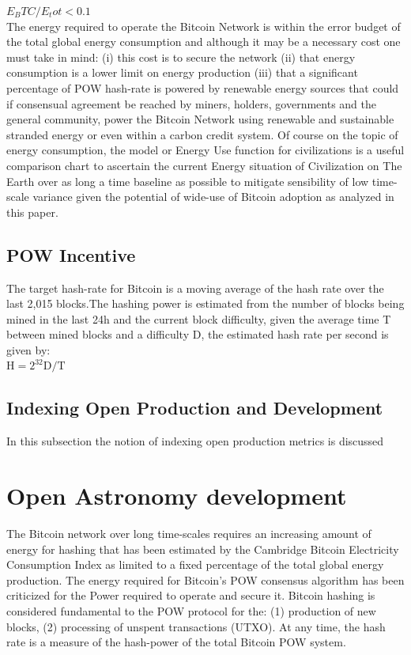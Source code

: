 \documentclass[final,5p,times,twocolumn,authoryear]{elsarticle}
\begin{document}
$E_BTC/E_tot < 0.1$
\\

The energy required to operate the Bitcoin Network is within the error budget of the total global energy consumption and although it may be a necessary cost one must take in mind: (i) this cost is to secure the network (ii) that energy consumption is a lower limit on energy production (iii) that a significant percentage of POW hash-rate is powered by renewable energy sources that could if consensual agreement be reached by miners,  holders, governments and the general community, power the Bitcoin Network using renewable and sustainable stranded energy or even within a carbon credit system. Of course on the topic of energy consumption, the \cite{kar64} model or Energy Use function for civilizations is a useful comparison chart to ascertain the current Energy situation of Civilization on The Earth over as long a time baseline as possible to mitigate sensibility of low time-scale variance given the potential of wide-use of Bitcoin adoption as analyzed in this paper.

 \subsection{POW Incentive}

The target hash-rate for Bitcoin is a moving average of the hash rate over the last 2,015 blocks.The hashing power is estimated from the number of blocks being mined in the last 24h and the current block difficulty, given the average time T between mined blocks and a difficulty D, the estimated hash rate per second is given by:\\

$\textrm{H} = 2^{32} \textrm{D} / \textrm{T}$\\

\subsection{Indexing Open Production and Development}
In this subsection the notion of indexing open production metrics is discussed

\section{Open Astronomy development}
\label{sec:btc4}

The Bitcoin network over long time-scales requires an increasing amount of energy for hashing that has been estimated by the Cambridge Bitcoin Electricity Consumption Index as limited to a fixed percentage of the total global energy production. The energy required for Bitcoin's POW consensus algorithm has been criticized for the Power required to operate and secure it. Bitcoin hashing is considered fundamental to the POW protocol for the: (1) production of new blocks, (2) processing of unspent transactions (UTXO). At any time, the hash rate is a measure of the hash-power of the total Bitcoin POW system.  
\end{document}
